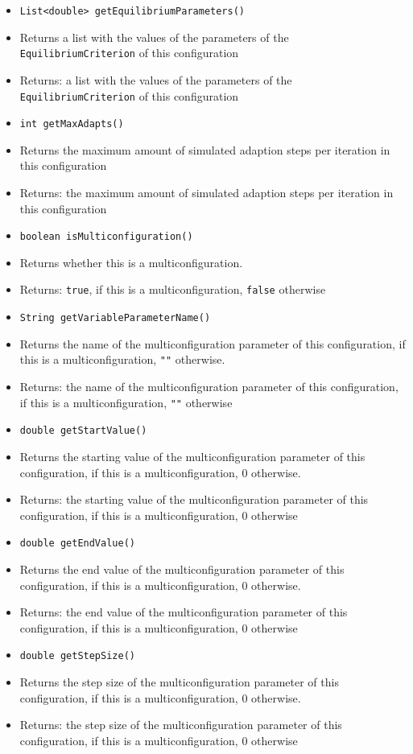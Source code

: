 \documentclass[parskip=full,11pt]{scrartcl}
\begin{document}
\begin{itemize}
	\item \texttt{List<double> getEquilibriumParameters()}
	\item[] Returns a list with the values of the parameters of the \texttt{EquilibriumCriterion} of this configuration
	\item[] Returns: a list with the values of the parameters of the \texttt{EquilibriumCriterion} of this configuration

	\item \texttt{int getMaxAdapts()}
	\item[] Returns the maximum amount of simulated adaption steps per iteration in this configuration
	\item[] Returns: the maximum amount of simulated adaption steps per iteration in this configuration

	\item \texttt{boolean isMulticonfiguration()}
	\item[] Returns whether this is a multiconfiguration.
	\item[] Returns: \texttt{true}, if this is a multiconfiguration, \texttt{false} otherwise

	\item \texttt{String getVariableParameterName()}
	\item[] Returns the name of the multiconfiguration parameter of this configuration, if this is a multiconfiguration, \texttt{""} otherwise.
	\item[] Returns: the name of the multiconfiguration parameter of this configuration, if this is a multiconfiguration, \texttt{""} otherwise

	\item \texttt{double getStartValue()}
	\item[] Returns the starting value of the multiconfiguration parameter of this configuration, if this is a multiconfiguration, \(0\) otherwise.
	\item[] Returns: the starting value of the multiconfiguration parameter of this configuration, if this is a multiconfiguration, \(0\) otherwise

	\item \texttt{double getEndValue()}
	\item[] Returns the end value of the multiconfiguration parameter of this configuration, if this is a multiconfiguration, \(0\) otherwise.
	\item[] Returns: the end value of the multiconfiguration parameter of this configuration, if this is a multiconfiguration, \(0\) otherwise
\newpage
	\item \texttt{double getStepSize()}
	\item[] Returns the step size of the multiconfiguration parameter of this configuration, if this is a multiconfiguration, \(0\) otherwise.
	\item[] Returns: the step size of the multiconfiguration parameter of this configuration, if this is a multiconfiguration, \(0\) otherwise
\end{itemize}
\end{document}
